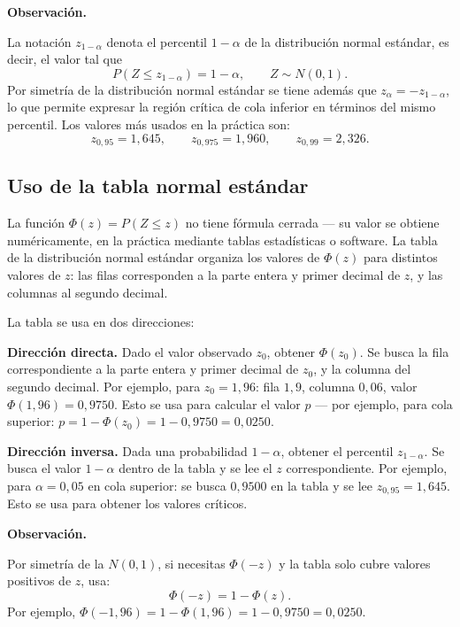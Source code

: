 \documentclass[12pt, a4paper]{book}
\newenvironment{observacion}{%
    \par\medskip\noindent\textbf{\color{azul}Observaci\'{o}n.}\enspace\itshape
}{\par\medskip}
\numberwithin{equation}{chapter}
\begin{document}
\begin{observacion}
	La notaci\'{o}n $z_{1-\alpha}$ denota el
	percentil $1 - \alpha$ de la distribuci\'{o}n
	normal est\'{a}ndar, es decir, el valor tal que
	\[
	P(Z \leq z_{1-\alpha}) = 1 - \alpha,
	\qquad Z \sim N(0,1).
	\]
	Por simetr\'{i}a de la distribuci\'{o}n normal
	est\'{a}ndar se tiene adem\'{a}s que
	$z_\alpha = -z_{1-\alpha}$, lo que permite
	expresar la regi\'{o}n cr\'{i}tica de cola
	inferior en t\'{e}rminos del mismo percentil.
	Los valores m\'{a}s usados en la pr\'{a}ctica
	son:
	\[
	z_{0{,}95} = 1{,}645, \qquad
	z_{0{,}975} = 1{,}960, \qquad
	z_{0{,}99} = 2{,}326.
	\]
\end{observacion}

\subsection{Uso de la tabla normal est\'{a}ndar}

La funci\'{o}n $\Phi(z) = P(Z \leq z)$ no tiene
f\'{o}rmula cerrada --- su valor se obtiene
num\'{e}ricamente, en la pr\'{a}ctica mediante
tablas estad\'{i}sticas o software. La tabla
de la distribuci\'{o}n normal est\'{a}ndar
organiza los valores de $\Phi(z)$ para distintos
valores de $z$: las filas corresponden a la parte
entera y primer decimal de $z$, y las columnas
al segundo decimal.

La tabla se usa en dos direcciones:

\medskip
\textbf{Direcci\'{o}n directa.} Dado el valor
observado $z_0$, obtener $\Phi(z_0)$. Se busca
la fila correspondiente a la parte entera y
primer decimal de $z_0$, y la columna del segundo
decimal. Por ejemplo, para $z_0 = 1{,}96$: fila
$1{,}9$, columna $0{,}06$, valor
$\Phi(1{,}96) = 0{,}9750$. Esto se usa para
calcular el valor $p$ --- por ejemplo, para cola
superior: $p = 1 - \Phi(z_0) = 1 - 0{,}9750
= 0{,}0250$.

\medskip
\textbf{Direcci\'{o}n inversa.} Dada una
probabilidad $1 - \alpha$, obtener el percentil
$z_{1-\alpha}$. Se busca el valor $1 - \alpha$
dentro de la tabla y se lee el $z$ correspondiente.
Por ejemplo, para $\alpha = 0{,}05$ en cola
superior: se busca $0{,}9500$ en la tabla y se
lee $z_{0{,}95} = 1{,}645$. Esto se usa para
obtener los valores cr\'{i}ticos.

\begin{observacion}
	Por simetr\'{i}a de la $N(0,1)$, si
	necesitas $\Phi(-z)$ y la tabla solo
	cubre valores positivos de $z$, usa:
	\[
	\Phi(-z) = 1 - \Phi(z).
	\]
	Por ejemplo, $\Phi(-1{,}96) = 1 -
	\Phi(1{,}96) = 1 - 0{,}9750 = 0{,}0250$.
\end{observacion}
\end{document}
